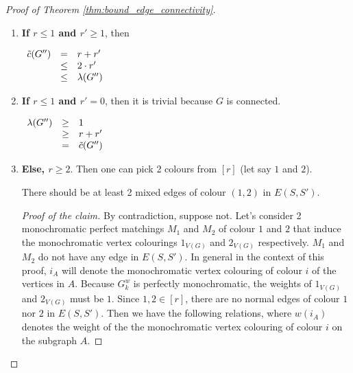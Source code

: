 \begin{proof}[Proof of Theorem \ref{thm:bound_edge_connectivity}]
\begin{enumerate}
            \begin{enumerate}
                \item 
                    \textbf{If $r \leq 1$ and $r' \geq 1$}, then 
                    
                    \begin{center}
                        $\begin{array}{l c l}
                            \Tilde{c}(G'')  & =    & r + r' \\
                                            & \leq & 2 \cdot r' \\
                                            & \leq & \lambda(G'')
                        \end{array}$
                    \end{center}
                    
                \item 
                    \textbf{If $r \leq 1$ and $r' = 0$}, then it is trivial because $G$ is connected.
                    
                    \begin{center}
                        $\begin{array}{lcl}
                            \lambda(G'')  & \geq & 1 \\
                                          & \geq & r + r' \\
                                          & =    & \Tilde{c}(G'')
                        \end{array}$
                    \end{center}
                    
                \item
                    \textbf{Else, $r \geq 2$}. Then one can pick 2 colours from $[r]$ (let say $1$ and $2$). 
                    
                    \begin{claim}
                        There should be at least 2 mixed edges of colour $(1, 2)$ in $E(S, S')$.
                    \end{claim}
                    
                    \begin{proof}[Proof of the claim]
                        By contradiction, suppose not. Let's consider 2 monochromatic perfect matchings $M_1$ and $M_2$ of colour $1$ and $2$ that induce the monochromatic vertex colourings $1_{V(G)}$ and $2_{V(G)}$ respectively. $M_1$ and $M_2$ do not have any edge in $E(S, S')$. In general in the context of this proof, $i_A$ will denote the monochromatic vertex colouring of colour $i$ of the vertices in $A$. Because $G_k^w$ is perfectly monochromatic, the weights of $1_{V(G)}$ and $2_{V(G)}$ must be $1$. Since $1, 2 \in [r]$, there are no normal edges of colour $1$ nor $2$ in $E(S, S')$. Then we have the following relations, where $w(i_A)$ denotes the weight of the the monochromatic vertex colouring of colour $i$ on the subgraph $A$.
                        

\end{proof}
\end{enumerate}
\end{enumerate}
\end{proof}
